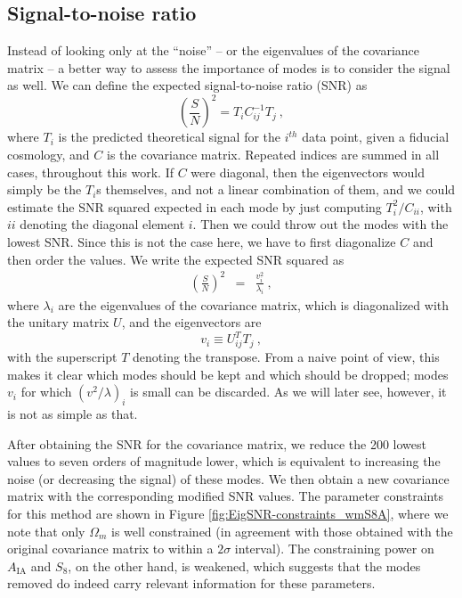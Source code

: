 \documentclass[aps, prd, twocolumn, superscriptaddress, nofootinbib, amssymb, amsmath]{revtex4-2}
\newcommand{\rf}[1]{Figure \ref{fig:#1}}
\newcommand\be{\begin{equation}}
\newcommand\ee{\end{equation}}
\newcommand\bea{\begin{eqnarray}}
\newcommand\eea{\end{eqnarray}}
\begin{document}
\subsection{Signal-to-noise ratio}
\label{subsec:snr}

Instead of looking only at the ``noise'' -- or the eigenvalues of the covariance matrix -- a better way to assess the importance of modes is to consider the signal as well. We can define the expected signal-to-noise ratio (SNR) as
\be
\left(\frac{S}{N}\right)^2 = T_i C^{-1}_{ij} T_j\
,\ee
where $T_i$ is the predicted theoretical signal for the $i^{th}$ data point, given a fiducial cosmology, and $C$ is the covariance matrix. Repeated indices are summed in all cases, throughout this work. If $C$ were diagonal, then the eigenvectors would simply be the $T_i$s themselves, and not a linear combination of them, and we could estimate the SNR squared expected in each mode by just computing $T_i^2/C_{ii}$, with $ii$ denoting the diagonal element $i$. Then we could throw out the modes with the lowest SNR. Since this is not the case here, we have to first diagonalize $C$ and then order the values. We write the expected SNR squared as
\bea
\left(\frac{S}{N}\right)^2
&=& \frac{v_i^2}{\lambda_i}\
,\eea
where $\lambda_i$ are the eigenvalues of the covariance matrix, which is diagonalized with the unitary matrix $U$, and the eigenvectors are 
\be
v_i\equiv U_{ij}^T T_j\
,\ee
with the superscript $T$ denoting the transpose. From a naive point of view, this makes it clear which modes should be kept and which should be dropped; modes $v_i$ for which $\left(v^2/\lambda\right)_i$ is small can be discarded. As we will later see, however, it is not as simple as that.

After obtaining the SNR for the covariance matrix, we reduce the 200 lowest values to seven orders of magnitude lower, which is equivalent to increasing the noise (or decreasing the signal) of these modes. We then obtain a new covariance matrix with the corresponding modified SNR values. The parameter constraints for this method are shown in \rf{EigSNR-constraints_wmS8A}, where we note that only $\Omega_m$ is well constrained (in agreement with those obtained with the original covariance matrix to within a $2\sigma$ interval). The constraining power on $A_{\text{IA}}$ and $S_8$, on the other hand, is weakened, which suggests that the modes removed do indeed carry relevant information for these parameters.
\end{document}
